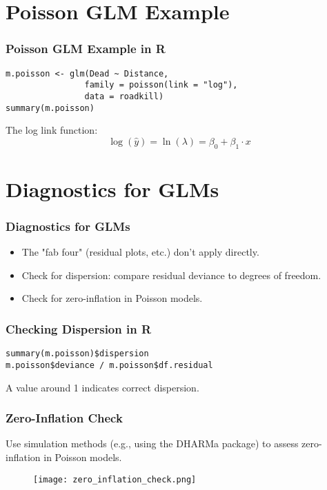 \documentclass{beamer}
\begin{document}
\section{Poisson GLM Example}

\begin{frame}
    \frametitle{Poisson GLM Example in R}
    \lstset{style=Rstyle}
    \begin{lstlisting}
m.poisson <- glm(Dead ~ Distance, 
                family = poisson(link = "log"),  
                data = roadkill)
summary(m.poisson)
    \end{lstlisting}
    
    The log link function:
    \[
    \log(\hat{y}) = \ln(\lambda) = \beta_0 + \beta_1 \cdot x
    \]
\end{frame}

\section{Diagnostics for GLMs}

\begin{frame}
    \frametitle{Diagnostics for GLMs}
    \begin{itemize}
        \item The "fab four" (residual plots, etc.) don't apply directly.
        \item Check for dispersion: compare residual deviance to degrees of freedom.
        \item Check for zero-inflation in Poisson models.
    \end{itemize}
\end{frame}

\begin{frame}[fragile]
    \frametitle{Checking Dispersion in R}
    \lstset{style=Rstyle}
    \begin{lstlisting}
summary(m.poisson)$dispersion
m.poisson$deviance / m.poisson$df.residual
    \end{lstlisting}
    A value around 1 indicates correct dispersion.
\end{frame}

\begin{frame}
    \frametitle{Zero-Inflation Check}
    Use simulation methods (e.g., using the DHARMa package) to assess zero-inflation in Poisson models.
    
    \begin{figure}
        \centering
        \texttt{[image: zero\_inflation\_check.png]}
    \end{figure}
\end{frame}
\end{document}
